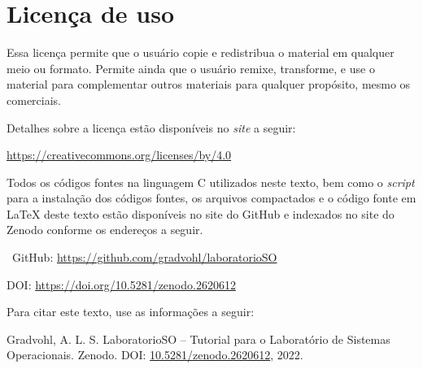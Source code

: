 \chapter*{Licença de uso}\label{chp:licenca}
\doclicenseThis

Essa licença permite que o usuário copie e redistribua o material em qualquer meio ou formato. Permite ainda que o usuário remixe, transforme, e use o material para complementar outros materiais para qualquer propósito, mesmo os comerciais.

 Detalhes sobre a licença estão disponíveis no \textit{site} a seguir:
 \begin{center}
    \url{https://creativecommons.org/licenses/by/4.0}     
 \end{center}

Todos os códigos fontes na linguagem C utilizados neste texto, bem como o \textit{script} para a instalação dos códigos fontes, os arquivos compactados e o código fonte em \LaTeX{} deste texto estão disponíveis no site do GitHub e indexados no site do Zenodo conforme os endereços a seguir.

\faGithub\ GitHub: \url{https://github.com/gradvohl/laboratorioSO}

DOI: \url{https://doi.org/10.5281/zenodo.2620612}

Para citar este texto, use as informações a seguir:

\noindent
{\sc Gradvohl, A. L. S.} LaboratorioSO -- Tutorial para o Laboratório de Sistemas Operacionais. Zenodo. DOI: \href{http://doi.org/10.5281/zenodo.2620612}{10.5281/zenodo.2620612}, 2022.
